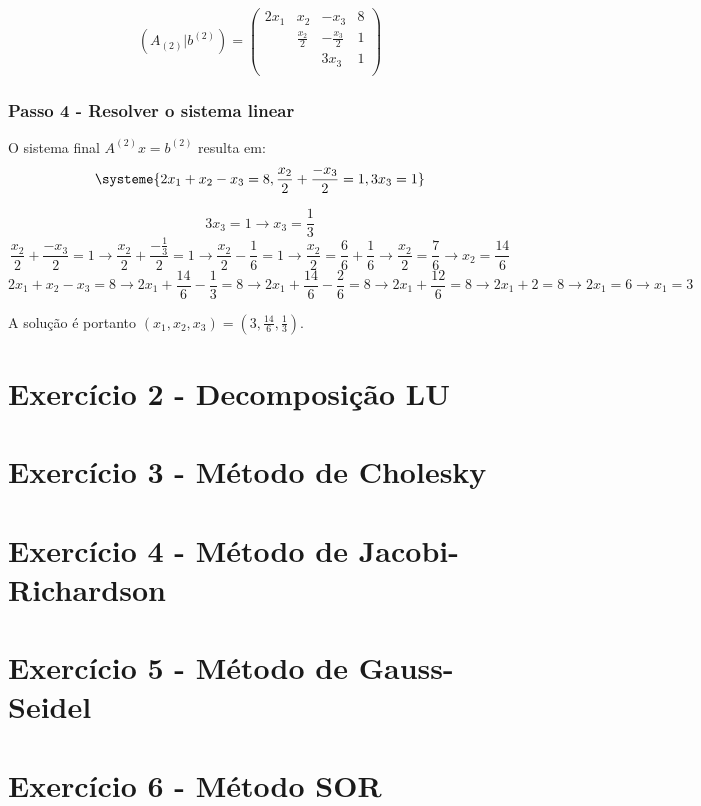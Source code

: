 \documentclass{article}
\begin{document}
            \[
                (A_{(2)}|b^{(2)}) =
                \left(
                    \begin{array}{ccc|c}
                        2x_1 & x_2 & -x_3 & 8 \\
                         & \frac{x_2}{2} & -\frac{x_3}{2} & 1 \\
                         &  & 3x_3 & 1 \\
                    \end{array}
                \right)
            \]

\subsubsection{Passo 4 - Resolver o sistema linear}
    O sistema final $A^(2)x = b^(2)$ resulta em:
    \[
        \systeme{2x_1 + x_2 - x_3 = 8, \frac{x_2}{2} + \frac{-x_3}{2} = 1,3x_3 = 1}
    \]

    \[
        3x_3 = 1 \rightarrow x_3 = \frac{1}{3}
    \]
\[
        \frac{x_2}{2} + \frac{-x_3}{2} = 1 \rightarrow \frac{x_2}{2} + \frac{-\frac{1}{3}}{2} = 1 \rightarrow \frac{x_2}{2} - \frac{1}{6} = 1 \rightarrow \frac{x_2}{2} = \frac{6}{6} + \frac{1}{6} \rightarrow \frac{x_2}{2} = \frac{7}{6} \rightarrow x_2 = \frac{14}{6}
    \]
    \[
        2x_1 + x_2 - x_3 = 8 \rightarrow 2x_1 + \frac{14}{6} - \frac{1}{3} = 8 \rightarrow 2x_1 + \frac{14}{6} - \frac{2}{6} = 8 \rightarrow 2x_1 + \frac{12}{6} = 8 \rightarrow 2x_1 + 2 = 8 \rightarrow 2x_1 = 6 \rightarrow x_1 = 3
    \]

    A solução é portanto $(x_1, x_2, x_3) = (3, \frac{14}{6}, \frac{1}{3})$.

\section{Exercício 2 - Decomposição LU}

\section{Exercício 3 - Método de Cholesky}

\section{Exercício 4 - Método de Jacobi-Richardson}

\section{Exercício 5 - Método de Gauss-Seidel}

\section{Exercício 6 - Método SOR}
\end{document}
